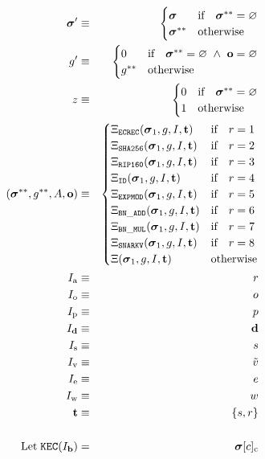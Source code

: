 \documentclass[9pt,oneside]{amsart}
\begin{document}
\begin{multicols}{2}
\begin{eqnarray}
\boldsymbol{\sigma}' & \equiv & \begin{cases}
\boldsymbol{\sigma} & \text{if} \quad \boldsymbol{\sigma}^{**} = \varnothing \\
\boldsymbol{\sigma}^{**} & \text{otherwise}
\end{cases} \\
g' & \equiv & \begin{cases}
0 & \text{if} \quad \boldsymbol{\sigma}^{**} = \varnothing \ \wedge \ \mathbf{o} = \varnothing \\
g^{**} & \text{otherwise}
\end{cases} \\ \nonumber
z & \equiv & \begin{cases}
0 & \text{if} \quad \boldsymbol{\sigma}^{**} = \varnothing \\
1 & \text{otherwise}
\end{cases} \\
\qquad (\boldsymbol{\sigma}^{**}, g^{**}, A, \mathbf{o}) & \equiv & \begin{cases}
\Xi_{\mathtt{ECREC}}(\boldsymbol{\sigma}_1, g, I, \mathbf{t}) & \text{if} \quad r = 1 \\
\Xi_{\mathtt{SHA256}}(\boldsymbol{\sigma}_1, g, I, \mathbf{t}) & \text{if} \quad r = 2 \\
\Xi_{\mathtt{RIP160}}(\boldsymbol{\sigma}_1, g, I, \mathbf{t}) & \text{if} \quad r = 3 \\
\Xi_{\mathtt{ID}}(\boldsymbol{\sigma}_1, g, I, \mathbf{t}) & \text{if} \quad r = 4 \\
\Xi_{\mathtt{EXPMOD}}(\boldsymbol{\sigma}_1, g, I, \mathbf{t}) & \text{if} \quad r = 5 \\
\Xi_{\mathtt{BN\_ADD}}(\boldsymbol{\sigma}_1, g, I, \mathbf{t}) & \text{if} \quad r = 6 \\
\Xi_{\mathtt{BN\_MUL}}(\boldsymbol{\sigma}_1, g, I, \mathbf{t}) & \text{if} \quad r = 7 \\
\Xi_{\mathtt{SNARKV}}(\boldsymbol{\sigma}_1, g, I, \mathbf{t}) & \text{if} \quad r = 8 \\
\Xi(\boldsymbol{\sigma}_1, g, I, \mathbf{t}) & \text{otherwise} \end{cases} \\
I_{\mathrm{a}} & \equiv & r \\
I_{\mathrm{o}} & \equiv & o \\
I_{\mathrm{p}} & \equiv & p \\
I_{\mathbf{d}} & \equiv & \mathbf{d} \\
I_{\mathrm{s}} & \equiv & s \\
I_{\mathrm{v}} & \equiv & \tilde{v} \\
I_{\mathrm{e}} & \equiv & e \\
I_{\mathrm{w}} & \equiv & w \\
\mathbf{t} & \equiv & \{s, r\} \\
\\ \nonumber
\text{Let} \; \mathtt{\tiny KEC}(I_{\mathbf{b}}) & = & \boldsymbol{\sigma}[c]_{\mathrm{c}}
\end{eqnarray}


\end{multicols}
\end{document}
